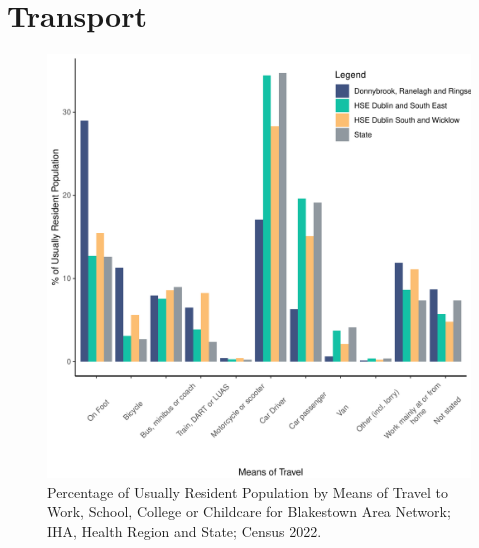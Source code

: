 \documentclass{article}
\begin{document}
\section{Transport}\label{sect:Trans}
\begin{figure}[H]
	\centering
	\includegraphics[width = 120mm]{../figures/TravelED.pdf}
	\caption{Percentage of Usually Resident Population by Means of Travel to Work, School, College or Childcare for Blakestown Area Network; IHA, Health Region and State; Census 2022.}
	\label{fig:vbnv}
	\end{figure}
\end{document}
